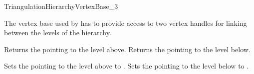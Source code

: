 
\begin{ccRefConcept}{TriangulationHierarchyVertexBase_3}

\ccDefinition

The vertex base used by  has to provide
access to two vertex handles for linking between the levels of the hierarchy.



\ccAccessFunctions
{}

{Returns the  pointing to the level above.}
{Returns the  pointing to the level below.}


{Sets the  pointing to the level above to .}
{Sets the  pointing to the level below to .}

\ccHasModels



\end{ccRefConcept}
